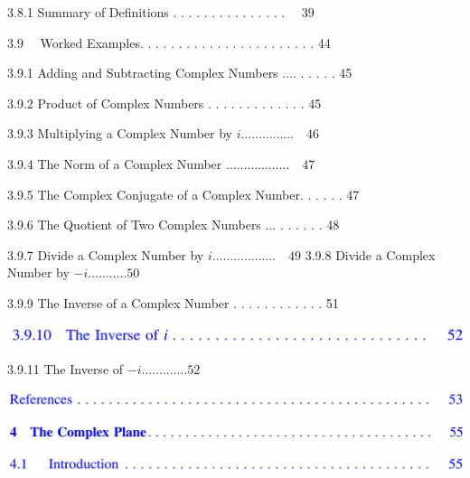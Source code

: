 \documentclass[10pt]{article}
\begin{document}
3.8.1 Summary of Definitions . . . . . . . . . . . . . . . $\quad 39$

$3.9 \quad$ Worked Examples. . . . . . . . . . . . . . . . . . . . . . . 44

3.9.1 Adding and Subtracting Complex Numbers .... . . . . . 45

3.9.2 Product of Complex Numbers . . . . . . . . . . . . . 45

3.9.3 Multiplying a Complex Number by $i \ldots \ldots \ldots \ldots \ldots \quad 46$

3.9.4 The Norm of a Complex Number $\ldots \ldots \ldots \ldots \ldots \ldots \quad 47$

3.9.5 The Complex Conjugate of a Complex Number. . . . . . 47

3.9.6 The Quotient of Two Complex Numbers ... . . . . . . 48

3.9.7 Divide a Complex Number by $i \ldots \ldots \ldots \ldots \ldots \ldots \quad 49$ 3.9.8 Divide a Complex Number by $-i \ldots \ldots . \ldots .50$

3.9.9 The Inverse of a Complex Number . . . . . . . . . . . . 51

\begin{center}
\includegraphics[max width=\textwidth]{2023_04_20_41f1ceac5a31dc7d1b59g-011(6)}
\end{center}

3.9.11 The Inverse of $-i \ldots \ldots . \ldots \ldots 52$

\begin{center}
\includegraphics[max width=\textwidth]{2023_04_20_41f1ceac5a31dc7d1b59g-011(2)}
\end{center}

\begin{center}
\includegraphics[max width=\textwidth]{2023_04_20_41f1ceac5a31dc7d1b59g-011(13)}
\end{center}

\begin{center}
\includegraphics[max width=\textwidth]{2023_04_20_41f1ceac5a31dc7d1b59g-011(14)}
\end{center}
\end{document}

